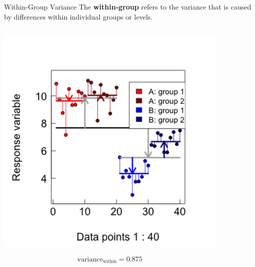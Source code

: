 \documentclass{beamer}
\begin{document}
\begin{frame}{Within-Group Variance}
  \footnotesize{The \textbf{within-group} refers to the variance that is caused by differences within individual groups or levels.}
  
  \begin{columns}[onlytextwidth] 
  \begin{column}{0.5\textwidth}
  \begin{center}
        \includegraphics[width=0.999\textwidth]{lectures/day_1_intro_to_mems/figures/unnamed-chunk-36-1.png}
      \end{center}
      \[ \text{variance}_{\text{within}} = 0.875 \]
  \end{column}
    \hspace{0.02\textwidth} %
    \begin{column}{0.5\textwidth}
      \begin{center}

\end{center}
\end{column}
\end{columns}
\end{frame}
\end{document}
